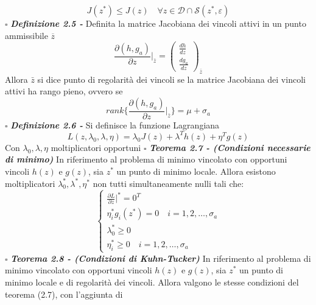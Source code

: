 \documentclass{article}
\begin{document}
\begin{equation}
J(z^*) \leq J(z) \quad \forall z \in \mathcal{D} \cap \mathcal{S}(z^*,\varepsilon)
\end{equation}
\nobreak 
\hfill
$\square$
\newline
\textbf{\textit{Definizione 2.5 -}} Definita la matrice Jacobiana dei vincoli attivi in un punto ammissibile $\overline{z}$
\begin{equation}
    \frac{\partial{(h,g_a)}}{\partial{z}} \bigg\rvert_{\bar{z}} = 
    \begin{pmatrix}
        \frac{dh}{dz} \\ 
        \frac{dg_a}{dz}
    \end{pmatrix}_{\bar{z}}
\end{equation} 
Allora $\bar{z}$ si dice punto di regolarità dei vincoli se la matrice Jacobiana dei vincoli attivi ha rango pieno, ovvero se
\begin{equation}
    rank \bigg\{ \frac{\partial{(h,g_a)}}{\partial{z}} \bigg\rvert_{\bar{z}} \bigg\} = \mu + \sigma_a
\end{equation}
\nobreak 
\hfill
$\square$
\newline
\textbf{\textit{Definizione 2.6 -}} Si definisce la funzione Lagrangiana
\begin{equation}
    L(z,\lambda_0,\lambda,\eta) = \lambda_0 J(z) + \lambda^T h(z) + \eta^T g(z)
\end{equation} 
Con $\lambda_0,\lambda,\eta$ moltiplicatori opportuni
\nobreak 
\hfill
$\square$
\medskip
\newline
\textbf{\textit{Teorema 2.7 - (Condizioni necessarie di minimo)}} In riferimento al problema di minimo vincolato con opportuni vincoli $h(z)$ e $g(z)$, sia $z^*$ un punto di minimo locale. Allora esistono moltiplicatori $\lambda_0^*,\lambda^*,\eta^*$ non tutti simultaneamente nulli tali che:
\begin{equation}
    \begin{cases}
        \frac{\partial L}{\partial z}\big\rvert^* = 0^T \\
        \eta_i^*g_i(z^*) = 0 \quad i = 1,2,\dots,\sigma_a \\
        \lambda_0^* \geq 0 \\
        \eta_i^* \geq 0  \quad i = 1,2,\dots,\sigma_a
    \end{cases}
\end{equation} 
\nobreak 
\hfill
$\square$
\newpage
\noindent
\textbf{\textit{Teorema 2.8 - (Condizioni di Kuhn-Tucker)}} In riferimento al problema di minimo vincolato con opportuni vincoli $h(z)$ e $g(z)$, sia $z^*$ un punto di minimo locale e di regolarità dei vincoli. Allora valgono le stesse condizioni del teorema (2.7), con l'aggiunta di
\end{document}

